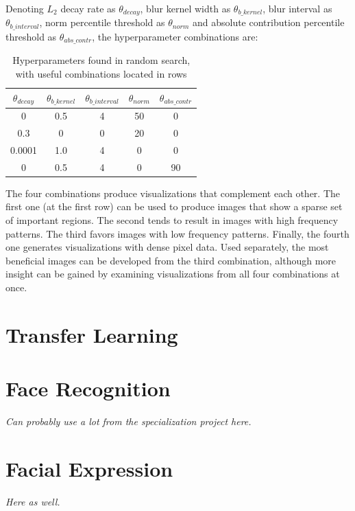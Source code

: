 \noindent Denoting $L_2$ decay rate as $\theta_{decay}$, blur kernel width as $\theta_{b\_kernel}$, blur interval as $\theta_{b\_interval}$, norm percentile threshold as $\theta_{norm}$ and absolute contribution percentile threshold as $\theta_{abs\_contr}$, the hyperparameter combinations are:

\begin{table}[!h]
\begin{center}
\begin{tabular}{|c|c|c|c|c|}
\hline
\textbf{$\theta_{decay}$} & \textbf{$\theta_{b\_kernel}$} & \textbf{$\theta_{b\_interval}$} & \textbf{$\theta_{norm}$} & \textbf{$\theta_{abs\_contr}$} \\ \hline
0 & 0.5 & 4 & 50 & 0 \\ \hline
0.3 & 0 & 0 & 20 & 0 \\ \hline
0.0001 & 1.0 & 4 & 0 & 0 \\ \hline
0 & 0.5 & 4 & 0 & 90 \\ \hline
\end{tabular}
\end{center}
\caption{Hyperparameters found in random search, with useful combinations located in rows}
\label{tab:reg_hyperparams}
\end{table}

\noindent The four combinations produce visualizations that complement each other. The first one (at the first row) can be used to produce images that show a sparse set of important regions. The second tends to result in images with high frequency patterns. The third favors images with low frequency patterns. Finally, the fourth one generates visualizations with dense pixel data. Used separately, the most beneficial images can be developed from the third combination, although more insight can be gained by examining visualizations from all four combinations at once.


\section{Transfer Learning}

\section{Face Recognition}

\textit{Can probably use a lot from the specialization project here.}

\section{Facial Expression}

\textit{Here as well.}

\cleardoublepage